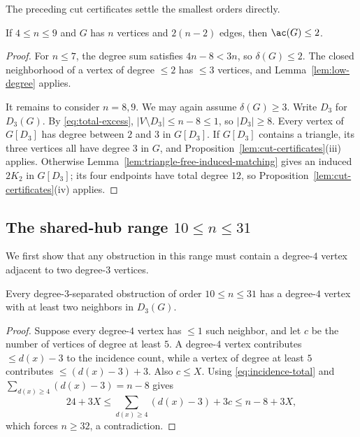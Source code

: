 The preceding cut certificates settle the smallest orders directly.

\begin{proposition}\label{prop:orders-4-9}
If \(4\le n\le9\) and \(G\) has \(n\) vertices and \(2(n-2)\) edges, then
\(\ac(G)\le2\).
\end{proposition}

\begin{proof}
For \(n\le7\), the degree sum satisfies \(4n-8<3n\), so
\(\delta(G)\le2\).  The closed neighborhood of a vertex of degree
\(\le2\) has \(\le3\) vertices, and Lemma~\ref{lem:low-degree}
applies.

It remains to consider \(n=8,9\).  We may again assume
\(\delta(G)\ge3\).  Write \(D_3\) for \(D_3(G)\).  By
\eqref{eq:total-excess},
\(|V\setminus D_3|\le n-8\le1\), so \(|D_3|\ge8\).  Every vertex of
\(G[D_3]\) has degree between \(2\) and \(3\) in \(G[D_3]\).  If
\(G[D_3]\) contains a triangle, its three
vertices all have degree \(3\) in \(G\), and
Proposition~\ref{lem:cut-certificates}(iii) applies.  Otherwise
Lemma~\ref{lem:triangle-free-induced-matching} gives an induced
\(2K_2\) in \(G[D_3]\); its four endpoints have total degree \(12\), so
Proposition~\ref{lem:cut-certificates}(iv) applies.
\end{proof}

\subsection{The shared-hub range \texorpdfstring{\(10\le n\le31\)}{10 <= n <= 31}}

We first show that any obstruction in this range must contain a degree-\(4\)
vertex adjacent to two degree-\(3\) vertices.

\begin{lemma}\label{lem:shared-hub-existence}
Every degree-\(3\)-separated obstruction of order \(10\le n\le31\)
has a degree-\(4\) vertex with at least two neighbors in \(D_3(G)\).
\end{lemma}

\begin{proof}
Suppose every degree-\(4\) vertex has \(\le1\) such neighbor, and let
\(c\) be the number of vertices of degree at least \(5\).  A degree-\(4\)
vertex contributes \(\le d(x)-3\) to the incidence count, while a
vertex of degree at least \(5\) contributes \(\le(d(x)-3)+3\).
Also \(c\le X\).  Using
\eqref{eq:incidence-total} and
\(\sum_{d(x)\ge4}(d(x)-3)=n-8\) gives
\[
 24+3X
 \le\sum_{d(x)\ge4}(d(x)-3)+3c
 \le n-8+3X,
\]
which forces \(n\ge32\), a contradiction.
\end{proof}


